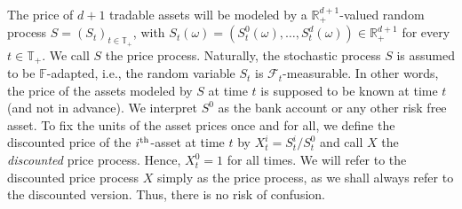 \documentclass[11pt,a4paper,twoside,openany]{report}
\numberwithin{equation}{section}
\theoremstyle{plain} %
\theoremstyle{definition} %
\theoremstyle{remark} %
\begin{document}
The price of \(d+1\) tradable assets will be modeled by a \(\mathbb{R}_+^{d+1}\)-valued random process \(S = (S_t)_{t\in\mathbb{T}_+}\), with \(S_t(\omega) = (S_t^0(\omega),\dots,S_t^d(\omega))\in \mathbb{R}_+^{d+1}\) for every \(t\in \mathbb{T}_+\). We call \(S\) the price process. Naturally, the stochastic process \(S\) is assumed to be \(\mathbb{F}\)-adapted, i.e., the random variable \(S_t\) is \(\mathcal{F}_t\)-measurable. In other words, the price of the assets modeled by \(S\) at time \(t\) is supposed to be known at time \(t\) (and not in advance). We interpret \(S^0\) as the bank account or any other risk free asset. To fix the units of the asset prices once and for all, we define the discounted price of the \(i^{\rm{th}}\)-asset at time \(t\) by \(X_t^{i}=S_t^{i}/S_t^0\) and call \(X\) the \textit{discounted} price process. Hence, \(X_t^0 = 1\) for all times. We will refer to the discounted price process \(X\) simply as the price process, as we shall always refer to the discounted version. Thus, there is no risk of confusion.
\end{document}
